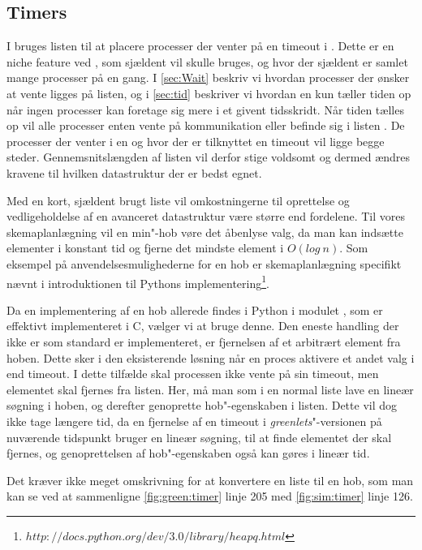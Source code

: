 \subsection{Timers}  
I \pycsp bruges listen  til at placere processer der venter på en timeout i . Dette er en niche feature ved \pycsp, som  sjældent vil skulle bruges, og hvor der sjældent er samlet mange processer på en gang. 
 I \cref{sec:Wait} beskriv vi hvordan processer der ønsker at vente ligges på  listen, og i \cref{sec:tid} beskriver vi hvordan \sched en kun tæller tiden op når ingen processer kan foretage sig mere i et givent tidsskridt. Når tiden tælles op vil  alle processer enten vente på kommunikation eller befinde sig i listen . De processer der venter i en  og hvor der er tilknyttet en timeout vil ligge begge steder. Gennemsnitslængden af listen vil derfor stige voldsomt og dermed ændres kravene til hvilken  datastruktur der er bedst egnet. 
 
Med en kort, sjældent brugt liste vil omkostningerne til oprettelse og vedligeholdelse af en avanceret datastruktur være større end fordelene. Til vores skemaplanlægning  vil en min"-hob vøre det åbenlyse valg, da  man kan  indsætte elementer i konstant tid og fjerne det mindste element i $O(log\ n)$. Som eksempel på anvendelsesmulighederne for en hob er skemaplanlægning specifikt nævnt i introduktionen til Pythons implementering\footnote{$http://docs.python.org/dev/3.0/library/heapq.html$}.  

Da en implementering af en hob allerede findes i Python i modulet , som er effektivt implementeret i C, vælger vi at bruge denne. Den eneste handling
der ikke er som standard er implementeret, er fjernelsen af et arbitrært element fra hoben. Dette sker i den eksisterende løsning når en proces
aktivere et andet valg i  end timeout. I dette tilfælde skal
processen ikke vente på sin timeout, men elementet skal fjernes fra
 listen. Her, må man som i
en normal liste lave en lineær søgning i hoben, og derefter genoprette
hob"-egenskaben i listen. Dette vil dog ikke tage længere tid, da en fjernelse af en timeout i \emph{greenlets}"-versionen på nuværende
tidspunkt bruger en lineær søgning, til at finde elementet der skal
fjernes, og genoprettelsen af hob"-egenskaben også kan gøres i lineær tid.

Det kræver ikke meget omskrivning for at konvertere en liste til en hob, som man kan se ved at sammenligne \cref{fig:green:timer} linje 205 med \cref{fig:sim:timer} linje 126. 

